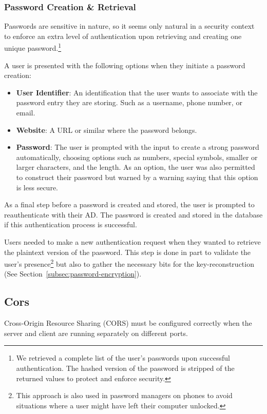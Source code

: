 \subsubsection{Password Creation \& Retrieval}\label{subsubsec:creation-and-retrieval}
Passwords are sensitive in nature, so it seems only natural in a security
context to enforce an extra level of authentication upon retrieving and creating
one unique password.\footnote{
  We retrieved a complete list of the user's passwords upon successful authentication.
  The hashed version of the password is stripped of the returned values to protect and enforce security.
}

A user is presented with the following options when they initiate a password
creation:

\begin{itemize}
  \item \textbf{User Identifier}: An identification that the user wants to
  associate with the password entry they are storing.
  Such as a username, phone number, or email.
  \item \textbf{Website}: A URL or similar where the password belongs.
  \item \textbf{Password}: The user is prompted with the input to create a
  strong password automatically, choosing options such as numbers, special
  symbols, smaller or larger characters, and the length.
  As an option, the user was also permitted to construct their password but
  warned by a warning saying that this option is less secure.
\end{itemize}

As a final step before a password is created and stored, the user is prompted to
reauthenticate with their AD\@.
The password is created and stored in the database if this authentication
process is successful.

Users needed to make a new authentication request when they wanted to retrieve
the plaintext version of the password.
This step is done in part to validate the user's presence\footnote{
  This approach is also used in password managers on phones to avoid situations
  where a user might have left their computer unlocked.
} but also to gather the necessary bits for the key-reconstruction
(See Section~\ref{subsec:password-encryption}).

\subsection{Cors}\label{subsec:cors}
Cross-Origin Resource Sharing (CORS) must be configured correctly when the
server and client are running separately on different ports.

